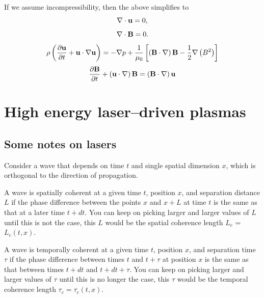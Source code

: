\documentclass[a4paper,11pt]{report}
\begin{document}
If we assume incompressibility, then the above simplifies to
\begin{equation}
    \nabla \cdot \mathbf{u} = 0,
\end{equation}
\begin{equation}
    \nabla \cdot \mathbf{B} = 0.
    \end{equation}
\begin{equation}
    \rho \left (\frac{\partial \mathbf{u}}{\partial t} + \mathbf{u} \cdot \nabla \mathbf{u} \right ) = - \nabla p  + \frac{1}{\mu_0} \left [ \left ( \mathbf{B} \cdot \nabla \right ) \mathbf{B} - \frac{1}{2} \nabla \left ( B^2 \right ) \right ]
\end{equation}
\begin{equation}
    \frac{\partial \mathbf{B}}{\partial t} + \left ( \mathbf{u} \cdot \nabla \right ) \mathbf{B} = \left ( \mathbf{B} \cdot \nabla \right ) \mathbf{u}
\end{equation}

\part{High energy laser--driven plasmas}

\chapter{Some notes on lasers}
Consider a wave that depends on time $t$ and single spatial dimension $x$, which is orthogonal to the direction of propagation. 

A wave is spatially coherent at a given time $t$, position $x$, and separation distance $L$ if the phase difference between the points $x$ and $x+L$ at time $t$ is the same as that at a later time $t+dt$. You can keep on picking larger and larger values of $L$ until this is not the case, this $L$ would be the spatial coherence length $L_c$ = $L_c(t,x)$.

A wave is temporally coherent at a given time $t$, position $x$, and separation time $\tau$ if the phase difference between times $t$ and $t+\tau$ at position $x$ is the same as that between times $t+dt$ and $t+dt+\tau$. You can keep on picking larger and larger values of $\tau$ until this is no longer the case, this $\tau$ would be the temporal coherence length $\tau_c = \tau_c(t,x)$.
\end{document}
